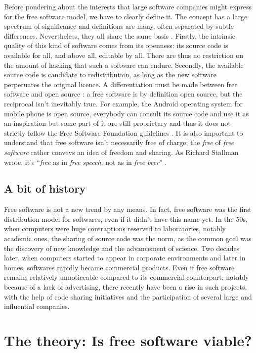 \documentclass[12pt]{article}
\begin{document}
Before pondering about the interests that large software companies
might express for the free software model, we have to clearly define
it. The concept has a large spectrum of significance and definitions
are many, often separated by subtle differences. Nevertheless, they
all share the same basis \cite{sers}. Firstly, the intrinsic quality
of this kind of software comes from its openness: its source code is
available for all, and above all, editable by all. There are thus no
restriction on the amount of hacking that such a software can
endure. Secondly, the available source code is candidate to
redistribution, as long as the new software perpetuates the original
licence. A differentiation must be made between free software and open
source : a free software is by definition open source, but the
reciprocal isn't inevitably true. For example, the Android operating
system for mobile phone is open source, everybody can consult its
source code and use it as an inspiration but some part of it are still
proprietary and thus it does not strictly follow the Free Software
Foundation guidelines \cite{and}. It is also important to understand
that free software isn't necessarily free of charge; the \textit{free}
of \textit{free software} rather conveys an idea of freedom and
sharing. As Richard Stallman wrote, it's ``\textit{free} as in
\textit{free speech}, not as in \textit{free beer}'' \cite{free}.

\subsection{A bit of history}

Free software is not a new trend by any means. In fact, free software
was the first distribution model for softwares, even if it didn't have
this name yet. In the 50s, when computers were huge contraptions
reserved to laboratories, notably academic ones, the sharing of source
code was the norm, as the common goal was the discovery of new
knowledge and the advancement of science. Two decades later, when
computers started to appear in corporate environments and later in
homes, softwares rapidly became commercial products. Even if free
software remains relatively unnoticeable compared to its commercial
counterpart, notably because of a lack of advertising, there recently
have been a rise in such projects, with the help of code sharing
initiatives and the participation of several large and influential
companies.

\section{The theory: Is free software viable?}
\end{document}
